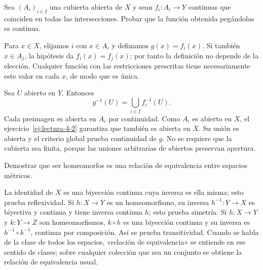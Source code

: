 \begin{ejercicio}\label{ej:lectura-5-8}
Sea $(A_i)_{i\in I}$ una cubierta abierta de $X$ y sean $f_i:A_i\to Y$ continuas que coinciden en todas las intersecciones. Probar que la función obtenida pegándolas es continua.
\end{ejercicio}
\begin{solucion}
Para $x\in X$, elijamos $i$ con $x\in A_i$ y definamos $g(x)=f_i(x)$. Si también $x\in A_j$, la hipótesis da $f_i(x)=f_j(x)$; por tanto la definición no depende de la elección. Cualquier función con las restricciones prescritas tiene necesariamente este valor en cada $x$, de modo que es única.

Sea $U$ abierto en $Y$. Entonces
\[
g^{-1}(U)=\bigcup_{i\in I}f_i^{-1}(U).
\]
Cada preimagen es abierta en $A_i$ por continuidad. Como $A_i$ es abierto en $X$, el ejercicio~\ref{ej:lectura-4-2} garantiza que también es abierta en $X$. Su unión es abierta y el criterio global prueba continuidad de $g$. No se requiere que la cubierta sea finita, porque las uniones arbitrarias de abiertos preservan apertura.
\end{solucion}

\begin{ejercicio}\label{ej:lectura-5-9}
Demostrar que ser homeomorfos es una relación de equivalencia entre espacios métricos.
\end{ejercicio}
\begin{solucion}
La identidad de $X$ es una biyección continua cuya inversa es ella misma; esto prueba reflexividad. Si $h:X\to Y$ es un homeomorfismo, su inversa $h^{-1}:Y\to X$ es biyectiva y continua y tiene inversa continua $h$; esto prueba simetría. Si $h:X\to Y$ y $k:Y\to Z$ son homeomorfismos, $k\circ h$ es una biyección continua y su inversa es $h^{-1}\circ k^{-1}$, continua por composición. Así se prueba transitividad. Cuando se habla de la clase de todos los espacios, «relación de equivalencia» se entiende en ese sentido de clases; sobre cualquier colección que sea un conjunto se obtiene la relación de equivalencia usual.
\end{solucion}

